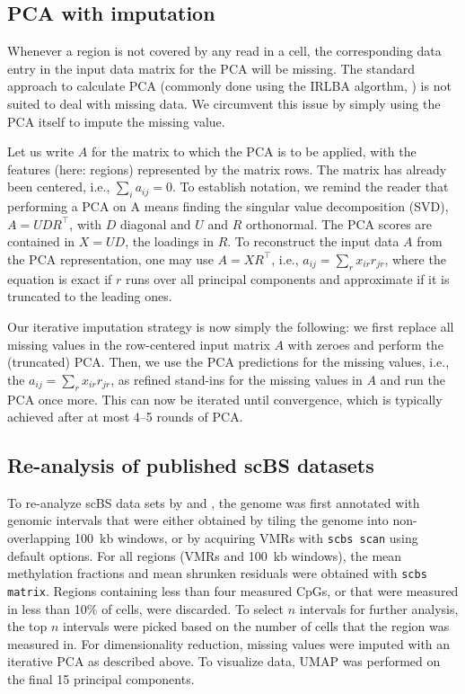 \documentclass[twocolumn,10pt]{article}
\begin{document}
\subsection{PCA with imputation}

Whenever a region is not covered by any read in a cell, the corresponding data entry in the input data matrix for the PCA will be missing. The standard approach to calculate PCA (commonly done using the IRLBA algorthm, \citep{Baglama2005}) is not suited to deal with missing data. We circumvent this issue by simply using the PCA itself to impute the missing value.

Let us write $A$ for the matrix to which the PCA is to be applied, with the features (here: regions) represented by the matrix rows. The matrix has already been centered, i.e., $\sum_i a_{ij}=0$. To establish notation, we remind the reader that performing a PCA on A means finding the singular value decomposition (SVD), $A=UDR^\top$, with $D$ diagonal and $U$ and $R$ orthonormal. The PCA scores are contained in $X=UD$, the loadings in $R$. To reconstruct the input data $A$ from the PCA representation, one may use $A=XR^\top$, i.e., $a_{ij}=\sum_r x_{ir} r_{jr}$, where the equation is exact if $r$ runs over all principal components and approximate if it is truncated to the leading ones.

Our iterative imputation strategy is now simply the following: we first replace all missing values in the row-centered input matrix $A$ with zeroes and perform the (truncated) PCA. Then, we use the PCA predictions for the missing values, i.e., the $a_{ij}=\sum_r x_{ir} r_{jr}$, as refined stand-ins for the missing values in $A$ and run the PCA once more. This can now be iterated until convergence, which is typically achieved after at most 4--5 rounds of PCA.

\subsection{Re-analysis of published scBS datasets}
To re-analyze scBS data sets by \citet{luo2017single} and \citet{argelaguet2019gastru}, the genome was first annotated with genomic intervals that were either obtained by tiling the genome into non-overlapping 100~kb windows, or by acquiring VMRs with \texttt{scbs scan} using default options. For all regions (VMRs and 100~kb windows), the mean methylation fractions and mean shrunken residuals were obtained with \texttt{scbs matrix}. Regions containing less than four measured CpGs, or that were measured in less than 10\% of cells, were discarded. To select $n$ intervals for further analysis, the top $n$ intervals were picked based on the number of cells that the region was measured in. 
For dimensionality reduction, missing values were imputed with an iterative PCA as described above. To visualize data, UMAP was performed on the final 15 principal components.
\end{document}
